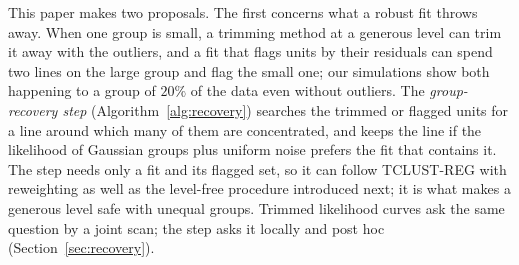 This paper makes two proposals. The first concerns what a robust fit throws away. When one
group is small, a trimming method at a generous level can trim it away with the outliers, and a
fit that flags units by their residuals can spend two lines on the large group and flag the small
one; our simulations show both happening to a group of $20\%$ of the data even without outliers.
The \emph{group-recovery step} (Algorithm~\ref{alg:recovery}) searches the trimmed or flagged
units for a line around which many of them are concentrated, and keeps the line if the
likelihood of Gaussian groups plus uniform noise prefers the fit that contains it. The step
needs only a fit and its flagged set, so it can follow TCLUST-REG with reweighting as well as
the level-free procedure introduced next; it is what makes a generous level safe with
unequal groups. Trimmed likelihood curves ask the same question by a joint scan; the step
asks it locally and post hoc (Section~\ref{sec:recovery}).

